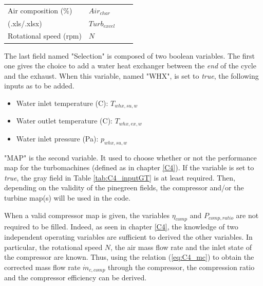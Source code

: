 \begin{longtable}[c]{ll|ll}
Air composition (\%)                                                                   & $Air_{char}$          & \begin{tabular}[c]{@{}l@{}}{\color{PineGreen}{Turbine}} \\ {\color{PineGreen}{performance map}} (.xls/.xlsx)\end{tabular}    & $Turb_{excel}$        \\
{\color{Gray} Rotational speed} (rpm)                                                  & $N$                   &                                                                                                        &                       \\* \bottomrule
\end{longtable}

The last field named "Selection" is composed of two boolean variables. The first one gives the choice to add a water heat exchanger between the \textit{end} of the cycle and the exhaust. When this variable, named "WHX", is set to \textit{true}, the following inputs as to be added.

\begin{itemize}
\item Water inlet temperature (\degree C): $T_{whx,su,w}$
\item Water outlet temperature (\degree C): $T_{whx,ex,w}$
\item Water inlet pressure (Pa): $p_{whx,su,w}$
\end{itemize}

"MAP" is the second variable. It used to choose whether or not the performance map for the turbomachines (defined as in chapter \ref{C4}). If the variable is set to \textit{true}, the {\color{Gray} gray} field in Table \ref{tab:C4_inputGT} is at least required. Then, depending on the validity of the {\color{PineGreen} pinegreen} fields, the compressor and/or the turbine map(s) will be used in the code. 

When a valid compressor map is given, the variables $\eta_{comp}$ and $P_{comp,ratio}$ are not required to be filled. Indeed, as seen in chapter \ref{C4}, the knowledge of two independent operating variables are sufficient to derived the other variables. In particular, the rotational speed $N$, the air mass flow rate and the inlet state of the compressor are known. Thus, using the relation (\ref{eq:C4_mc}) to obtain the corrected mass flow rate $\dot{m}_{c,comp}$ through the compressor, the compression ratio and the compressor efficiency can be derived.  

